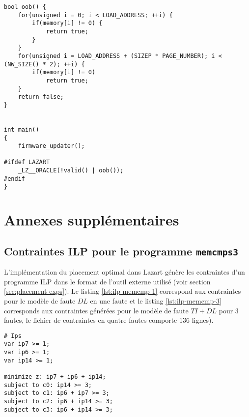 \begin{lstlisting}
bool oob() {
    for(unsigned i = 0; i < LOAD_ADDRESS; ++i) {
        if(memory[i] != 0) {
            return true;
        }
    }
    for(unsigned i = LOAD_ADDRESS + (SIZEP * PAGE_NUMBER); i < (NW_SIZE() * 2); ++i) {
        if(memory[i] != 0)
            return true;
    }
    return false;
}


int main()
{
    firmware_updater();

#ifdef LAZART
    _LZ__ORACLE(!valid() | oob());
#endif
}
\end{lstlisting} 


\chapter{Annexes supplémentaires}

    \section{Contraintes ILP pour le programme \texttt{memcmps3}}
    \label{annexe:ilp-memcmp}

        L'implémentation du placement optimal dans Lazart génère les contraintes d'un programme ILP dans le format de l'outil externe utilisé (voir section \ref{sec:placement-exps}). Le listing \ref{lst:ilp-memcmp-1} correspond aux contraintes pour le modèle de faute $DL$ en une faute et le listing \ref{lst:ilp-memcmp-3} corresponds aux contraintes générées pour le modèle de faute $TI+DL$ pour 3 fautes, le fichier de contraintes en quatre fautes comporte 136 lignes).

\begin{lstlisting}
# Ips
var ip7 >= 1;
var ip6 >= 1;
var ip14 >= 1;

minimize z: ip7 + ip6 + ip14;
subject to c0: ip14 >= 3;
subject to c1: ip6 + ip7 >= 3;
subject to c2: ip6 + ip14 >= 3;
subject to c3: ip6 + ip14 >= 3;
\end{lstlisting}

